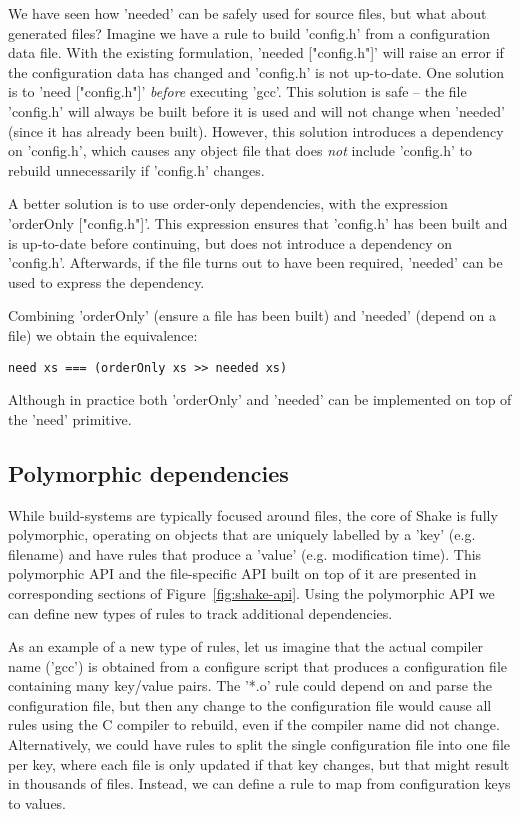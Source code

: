We have seen how \lst'needed' can be safely used for source files, but what
about generated files? Imagine we have a rule to build \lst'config.h' from a
configuration data file. With the existing formulation,
\lst'needed ["config.h"]' will raise an error if the configuration data has
changed and \lst'config.h' is not up-to-date. One solution is to \lst'need ["config.h"]'
\emph{before} executing \lst'gcc'. This solution is safe -- the file
\lst'config.h' will always be built before it is used and will not change when
\lst'needed' (since it has already been built). However, this solution
introduces a dependency on \lst'config.h', which causes any object file that
does \emph{not} include \lst'config.h' to rebuild unnecessarily if
\lst'config.h' changes.

A better solution is to use order-only dependencies, with the expression
\lst'orderOnly ["config.h"]'. This expression ensures that \lst'config.h' has
been built and is up-to-date before continuing, but does not introduce a
dependency on \lst'config.h'. Afterwards, if the file turns out to have been
required, \lst'needed' can be used to express the dependency.

Combining \lst'orderOnly' (ensure a file has been built) and \lst'needed' (depend on a file) we obtain the equivalence:

\begin{lstlisting}
need xs === (orderOnly xs >> needed xs)
\end{lstlisting}

\noindent Although in practice both \lst'orderOnly' and \lst'needed' can be
implemented on top of the \lst'need' primitive.

\subsection{Polymorphic dependencies\label{sec:polymorphic}}

While build-systems are typically focused around files, the core of Shake is
fully polymorphic, operating on objects that are uniquely labelled by a
\lst'key' (e.g. filename) and have rules that produce a \lst'value' (e.g.
modification time). This polymorphic API and the file-specific API built on top
of it are presented in corresponding sections of Figure~\ref{fig:shake-api}. Using
the polymorphic API we can define new types of rules to track additional
dependencies.

As an example of a new type of rules, let us imagine that the actual compiler
name (\lst'gcc') is obtained from a configure script that produces a
configuration file containing many key/value pairs. The \lst'*.o' rule could
depend on and parse the configuration file, but then any change to the
configuration file would cause all rules using the C compiler to rebuild, even
if the compiler name did not change. Alternatively, we could have rules to split
the single configuration file into one file per key, where each file is only
updated if that key changes, but that might result in thousands of files.
Instead, we can define a rule to map from configuration keys to values.

